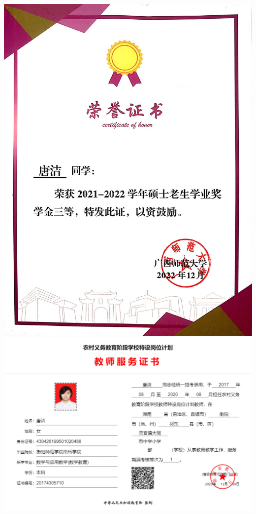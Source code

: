 \documentclass[UFT8]{ctexart}%
\begin{document}
\begin{center}
 \includegraphics[scale=0.15]{figs/2022-12.jpg }
 \includegraphics[scale=0.2]{figs/特岗服务证书.jpg }

\end{center}
\end{document}
